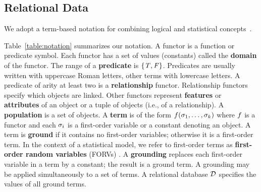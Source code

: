 {\subsection{Relational Data}





We adopt a term-based notation for combining logical and statistical concepts~\citep{Poole2003,Kimmig2014,Wang2008}. {Table~\ref{table:notation} summarizes our notation.
A functor is a function or predicate symbol. Each functor has a set of values (constants) called the \textbf{domain} of the functor. The range of a \textbf{predicate} is $\{\mathit{T},\mathit{F}\}$. Predicates are usually written with uppercase Roman letters, other terms with lowercase letters.
A predicate of arity at least two is a \textbf{relationship} functor. Relationship functors specify which objects are linked. Other functors represent \textbf{features} or \textbf{attributes} of an object or a tuple of objects (i.e., of a relationship).
A \textbf{population} is a set of objects. 
A \textbf{term} is of the form $f(\sigma_{1},\ldots,\sigma_{k})$ where $f$ is a functor %
and each $\sigma_{i}$ is a first-order variable or a constant denoting an object. A term is \textbf{ground} if it contains no first-order variables; otherwise it is a first-order term. In the context of a statistical model, we refer to first-order terms as \textbf{first-order random variables} (FORVs) \citep{Wang2008,Schulte2017a}. 
A \textbf{grounding} replaces each first-order variable in a term by a constant; the result is a ground term. A grounding may be applied simultaneously to a set of terms.  A relational database $\mathcal{D}$ specifies the values of all ground terms. %

}}
